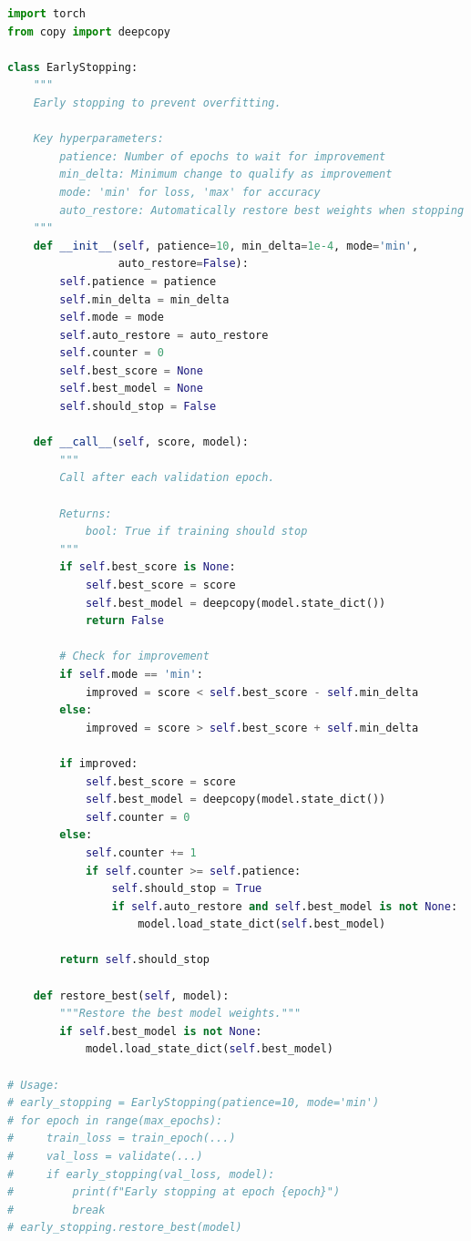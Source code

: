 \documentclass[../main.tex]{subfiles}
\begin{document}
\begin{lstlisting}[language=Python]
import torch
from copy import deepcopy

class EarlyStopping:
    """
    Early stopping to prevent overfitting.

    Key hyperparameters:
        patience: Number of epochs to wait for improvement
        min_delta: Minimum change to qualify as improvement
        mode: 'min' for loss, 'max' for accuracy
        auto_restore: Automatically restore best weights when stopping
    """
    def __init__(self, patience=10, min_delta=1e-4, mode='min',
                 auto_restore=False):
        self.patience = patience
        self.min_delta = min_delta
        self.mode = mode
        self.auto_restore = auto_restore
        self.counter = 0
        self.best_score = None
        self.best_model = None
        self.should_stop = False

    def __call__(self, score, model):
        """
        Call after each validation epoch.

        Returns:
            bool: True if training should stop
        """
        if self.best_score is None:
            self.best_score = score
            self.best_model = deepcopy(model.state_dict())
            return False

        # Check for improvement
        if self.mode == 'min':
            improved = score < self.best_score - self.min_delta
        else:
            improved = score > self.best_score + self.min_delta

        if improved:
            self.best_score = score
            self.best_model = deepcopy(model.state_dict())
            self.counter = 0
        else:
            self.counter += 1
            if self.counter >= self.patience:
                self.should_stop = True
                if self.auto_restore and self.best_model is not None:
                    model.load_state_dict(self.best_model)

        return self.should_stop

    def restore_best(self, model):
        """Restore the best model weights."""
        if self.best_model is not None:
            model.load_state_dict(self.best_model)

# Usage:
# early_stopping = EarlyStopping(patience=10, mode='min')
# for epoch in range(max_epochs):
#     train_loss = train_epoch(...)
#     val_loss = validate(...)
#     if early_stopping(val_loss, model):
#         print(f"Early stopping at epoch {epoch}")
#         break
# early_stopping.restore_best(model)
\end{lstlisting}
\end{document}

